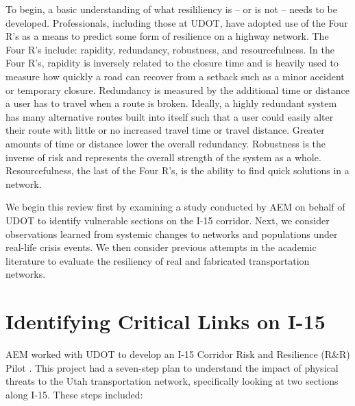 To begin, a basic understanding of what resililiency is -- or is not -- needs to be developed. Professionals, including those at UDOT, have adopted use of the Four R’s as a means to predict some form of resilience on a highway network. The Four R’s include: rapidity, redundancy, robustness, and resourcefulness. In the Four R's, rapidity is inversely related to the closure time and is heavily used to measure how quickly a road can recover from a setback such as a minor accident or temporary closure. Redundancy is measured by the additional time or distance a user has to travel when a route is broken. Ideally, a highly redundant system has many alternative routes built into itself such that a user could easily alter their route with little or no increased travel time or travel distance. Greater amounts of time or distance lower the overall redundancy. Robustness is the inverse of risk and represents the overall strength of the system as a whole. Resourcefulness, the last of the Four R’s, is the ability to find quick solutions in a network.

We begin this review first by examining a study conducted by AEM on
behalf of UDOT to identify
vulnerable sections on the I-15 corridor. Next, we consider observations
learned from systemic
changes to networks and populations under real-life crisis events. We then
consider previous
attempts in the academic literature to evaluate the resiliency of real and fabricated
transportation networks.

\section{Identifying Critical Links on I-15}

AEM worked with UDOT to develop an I-15 Corridor Risk and Resilience
(R\&R) Pilot \citep{aem2017}.
This
project had a seven-step plan to understand the impact of physical threats
to the Utah
transportation network, specifically looking at two sections along I-15.
These steps included:

